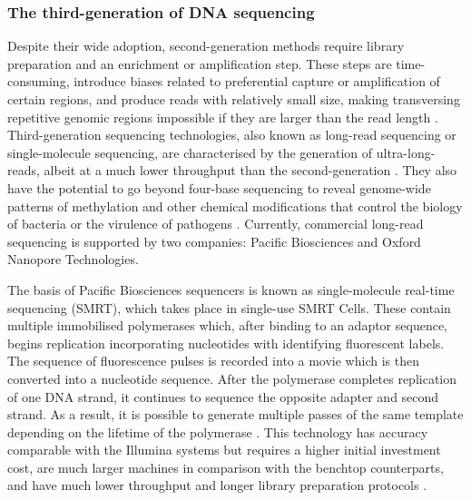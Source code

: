 \subsubsection{The third-generation of DNA sequencing} \label{ssec:3rd_gen_seq}

Despite their wide adoption, second-generation methods require library preparation and an enrichment or amplification step. These steps are time-consuming, introduce biases related to preferential capture or amplification of certain regions, and produce reads with relatively small size, making transversing repetitive genomic regions impossible if they are larger than the read length \citep{hagemann_overview_2015}. Third-generation sequencing technologies, also known as long-read sequencing or single-molecule sequencing, are characterised by the generation of ultra-long-reads, albeit at a much lower throughput than the second-generation \citep{hoang_long-reads-based_2022}. They also have the potential to go beyond four-base sequencing to reveal genome-wide patterns of methylation and other chemical modifications that control the biology of bacteria or the virulence of pathogens \citep{korlach_going_2012}. Currently, commercial long-read sequencing is supported by two companies: Pacific Biosciences and Oxford Nanopore Technologies. 

The basis of Pacific Biosciences sequencers is known as single-molecule real-time sequencing (SMRT), which takes place in single-use SMRT Cells. These contain multiple immobilised polymerases which, after binding to an adaptor sequence, begins replication incorporating nucleotides with identifying fluorescent labels. The sequence of fluorescence pulses is recorded into a movie which is then converted into a nucleotide sequence. After the polymerase completes replication of one DNA strand, it continues to sequence the opposite adapter and second strand. As a result, it is possible to generate multiple passes of the same template depending on the lifetime of the polymerase \citep{hoang_long-reads-based_2022, loman_twenty_2015}. This technology has accuracy comparable with the Illumina systems but requires a higher initial investment cost, are much larger machines in comparison with the benchtop counterparts, and have much lower throughput and longer library preparation protocols \citep{hoang_long-reads-based_2022, wenger_accurate_2019}. 

